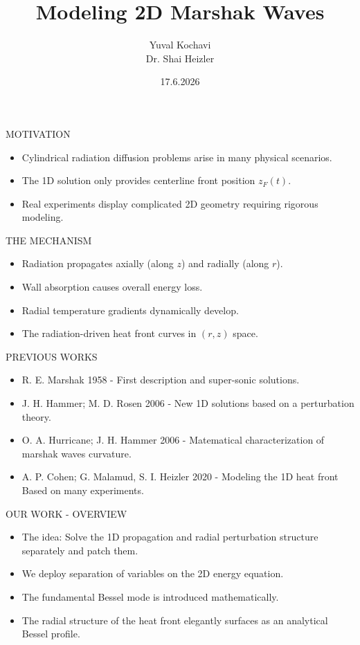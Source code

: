 \documentclass{beamer}
\title{\textbf{Modeling 2D Marshak Waves}}
\author{Yuval Kochavi \\ Dr. Shai Heizler}
\institute{The Hebrew University of Jerusalem}
\date{17.6.2026}
\begin{document}
\begin{frame}
  \titlepage
\end{frame}

\begin{frame}{MOTIVATION}
  \begin{itemize}
    \item Cylindrical radiation diffusion problems arise in many physical scenarios.
    \item The 1D solution only provides centerline front position $z_F(t)$.
    \item Real experiments display complicated 2D geometry requiring rigorous modeling. 
  \end{itemize}
\end{frame}

\begin{frame}{THE MECHANISM}
  \begin{itemize}
    \item Radiation propagates axially (along $z$) and radially (along $r$).
    \item Wall absorption causes overall energy loss.
    \item Radial temperature gradients dynamically develop.
    \item The radiation-driven heat front curves in $(r,z)$ space. 
  \end{itemize}
\end{frame}

\begin{frame}{PREVIOUS WORKS}
  \begin{itemize}
    \item R. E. Marshak  1958 - First description and super-sonic solutions. 
    \item J. H. Hammer; M. D. Rosen  2006 - New 1D solutions based on a perturbation theory.
    \item O. A. Hurricane; J. H. Hammer  2006 - Matematical characterization of marshak waves curvature.
    \item A. P. Cohen; G. Malamud, S. I. Heizler  2020 - Modeling the 1D heat front Based on many experiments.
  \end{itemize}
\end{frame}

\begin{frame}{OUR WORK - OVERVIEW}
  \begin{itemize}
    \item The idea: Solve the 1D propagation and radial perturbation structure separately and patch them.
    \item We deploy separation of variables on the 2D energy equation.
    \item The fundamental Bessel mode is introduced mathematically.
    \item The radial structure of the heat front elegantly surfaces as an analytical Bessel profile.
  \end{itemize}
\end{frame}
\end{document}
